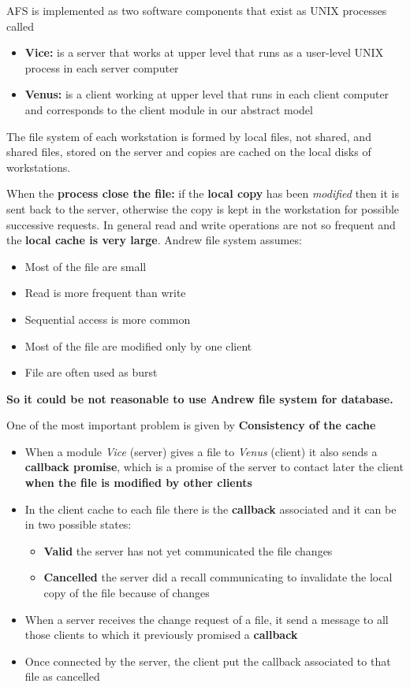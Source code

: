 AFS is implemented as two software components that exist as UNIX processes called 
\begin{itemize}
    \item \textbf{Vice:} is a server that works at upper level that runs as a user-level UNIX process in each server computer
    \item \textbf{Venus:} is a client working at upper level that runs in each client computer and corresponds to the client module in our abstract model
\end{itemize}


The file system of each workstation is formed by local files, not shared, and shared files, stored on the server and copies are cached on the local disks of workstations.

When the \textbf{process close the file:} if the \textbf{local copy} has been \textit{modified} then it is sent back to the server, otherwise the copy is kept in the workstation for possible successive requests. In general read and write operations are not so frequent and the \textbf{local cache is very large}. Andrew file system assumes:
\begin{itemize}
    \item Most of the file are small
    \item Read is more frequent than write
    \item Sequential access is more common
    \item Most of the file are modified only by one client
    \item File are often used as burst
\end{itemize}

\textbf{So it could be not reasonable to use Andrew file system for database.}

One of the most important problem is given by \textbf{Consistency of the cache}
\begin{itemize}
    \item When a module \textit{Vice} (server) gives a file to \textit{Venus} (client) it also sends a \textbf{callback promise}, which is a promise of the server to contact later the client \textbf{when the file is modified by other clients}
    \item In the client cache to each file there is the \textbf{callback} associated and it can be in two possible states:
    \begin{itemize}
        \item \textbf{Valid} the server has not yet communicated the file changes
        \item \textbf{Cancelled} the server did a recall communicating to invalidate the local copy of the file because of changes
    \end{itemize}
    \item When a server receives the change request of a file, it send a message to all those clients to which it previously promised a \textbf{callback}
    \item Once connected by the server, the client put the callback associated to that file as cancelled
\end{itemize}

